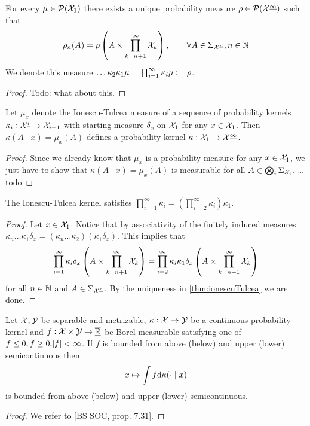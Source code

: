 \begin{thm}
  For every $\mu \in \mathcal{P}(\mathcal{X}_1)$ 
  there exists a unique probability measure
  $\rho \in \mathcal{P}(\mathcal{X}^{\underline{\infty}})$ such that
  \[ \rho_n(A) = \rho \left( A \times \prod_{k=n+1}^\infty \mathcal{X}_k \right)
  , \qquad \forall A \in \Sigma_{\mathcal{X}^{\underline{n}}}, n \in \mathbb{N} \]
  We denote this measure
  $\dots \kappa_2 \kappa_1 \mu = \prod_{i=1}^\infty \kappa_i \mu \vcentcolon= \rho$.
  \label{thm:ionescuTulcea}
\end{thm}
\begin{proof}
  Todo: what about this.
\end{proof}

\begin{prop}
  Let $\mu_x$ denote the Ionescu-Tulcea measure of a
  sequence of probability kernels
  $\kappa_i : \mathcal{X}^{\underline{i}} \to \mathcal{X}_{i+1}$
  with starting measure $\delta_x$ on $\mathcal{X}_1$ for any $x \in \mathcal{X}_1$.
  Then $\kappa(A \mid x) = \mu_x(A)$ defines a probability kernel
  $\kappa : \mathcal{X}_1 \to \mathcal{X}^{\underline{\infty}}$.
\end{prop}
\begin{proof}
  Since we already know that $\mu_x$ is a probability measure for any
  $x \in \mathcal{X}_1$,
  we just have to show that $\kappa(A \mid x) = \mu_x(A)$ is measurable for all
  $A \in \bigotimes_i \Sigma_{\mathcal{X}_i}$.
  \dots todo
\end{proof}

\begin{lem}
  The Ionescu-Tulcea kernel satisfies
  $\prod_{i=1}^\infty \kappa_i = (\prod_{i=2}^\infty \kappa_i) \kappa_1 $.
  \label{lem:ionescu}
\end{lem}
\begin{proof}
  Let $x \in \mathcal{X}_1$.
  Notice that by associativity of the finitely induced measures
  $\kappa_n \dots \kappa_1 \delta_x
  = (\kappa_n \dots \kappa_2) (\kappa_1 \delta_x)$.
  This implies that
  \[ \prod_{i=1}^\infty \kappa_i \delta_x
    \left( A \times \prod_{k=n+1}^\infty \mathcal{X}_k \right)
    = \prod_{i=2}^\infty \kappa_i \kappa_1 \delta_x
  \left( A \times \prod_{k=n+1}^\infty \mathcal{X}_k \right) \]
  for all $n \in \mathbb{N}$ and $A \in \Sigma_{\mathcal{X}^{\underline{n}}}$.
  By the uniqueness in \cref{thm:ionescuTulcea} we are done.
\end{proof}


\begin{prop}
  Let $\mathcal{X}, \mathcal{Y}$ be separable and metrizable,
  $\kappa : \mathcal{X} \to \mathcal{Y}$ be a continuous probability kernel
  and $f:\mathcal{X} \times \mathcal{Y} \to \underline{\overline{\mathbb{R}}}$ be Borel-measurable
  satisfying one of
  $f \leq 0, f \geq 0, \abs{f} < \infty$.
  If $f$ is bounded from above (below) and upper (lower) semicontinuous
  then
  \[ x \mapsto \int f \mathrm{d} \kappa(\cdot \mid x) \]
  is bounded from above (below) and upper (lower) semicontinuous. 
  \label{prop:BS7_31}
\end{prop}

\begin{proof}
  We refer to [BS SOC, prop. 7.31]. %
\end{proof}

